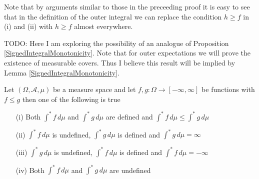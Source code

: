 Note that by arguments similar to those in the preceeding proof it is easy to see that in the definition of the outer integral we can replace the condition $h \geq f$  in (i) and (ii) with $h \geq f$ almost everywhere.

TODO: Here I am exploring the possibility of an analogue of Proposition \ref{SignedIntegralMonotonicity}.  Note that for outer expectations we will prove the existence of measurable covers.  Thus I believe this result will be implied by Lemma \ref{SignedIntegralMonotonicity}.
\begin{prop}\label{OuterIntegralMonotonicity}Let $(\Omega, \mathcal{A}, \mu)$ be a measure space and let $f,g: \Omega \to [-\infty, \infty]$ be functions with
$f \leq g$ then one of the following is true
\begin{itemize}
\item[(i)]Both $\int^* f \, d\mu$ and $\int^* g \, d\mu$ are defined and $\int^* f \, d\mu \leq \int^* g \, d\mu$
\item[(ii)]$\int^* f \, d\mu$ is undefined, $\int^* g \, d\mu$ is defined and $\int^* g \, d\mu = \infty$
\item[(iii)]$\int^* g \, d\mu$ is undefined, $\int^* f \, d\mu$ is defined and $\int^* f \, d\mu = -\infty$
\item[(iv)]Both $\int^* f \, d\mu$ and $\int^* g \, d\mu$ are undefined
\end{itemize}
\end{prop}
